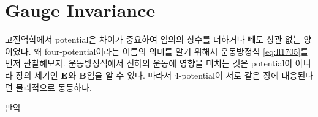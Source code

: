 \section{Gauge Invariance}
\label{sec:05a-04a}

고전역학에서 potential은 차이가 중요하여 임의의 상수를 더하거나 빼도 상관 없는 양이었다. 왜 four-potential이라는 이름의 의미를 알기 위해서 운동방정식 \eqref{eq:ll1705}를 먼저 관찰해보자. 운동방정식에서 전하의 운동에 영향을 미치는 것은 potential이 아니라 장의 세기인 $\vb{E}$와 $\vb{B}$임을 알 수 있다. 따라서 4-potential이 서로 같은 장에 대응된다면 물리적으로 동등하다.

만약